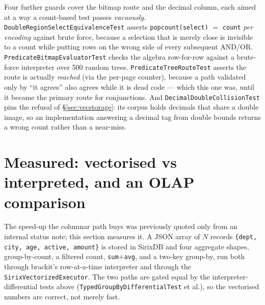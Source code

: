 \documentclass[11pt,a4paper,oneside]{report}
\theoremstyle{sirixthm}
\newcommand{\code}[1]{\texttt{#1}}
\begin{document}
Four further guards cover the bitmap route and the decimal column, each aimed at a way a
count-based test passes \emph{vacuously}. \code{DoubleRegionSelectEquivalenceTest} asserts
\code{popcount(select)} $=$ \code{count} \emph{per encoding} against brute force, because a
selection that is merely close is invisible to a count while putting rows on the wrong side of every
subsequent AND/OR. \code{PredicateBitmapEvaluatorTest} checks the algebra row-for-row against a
brute-force interpreter over 500 random trees. \code{PredicateTreeRouteTest} asserts the route is
actually \emph{reached} (via the per-page counter), because a path validated only by ``it agrees''
also agrees while it is dead code --- which this one was, until it became the primary route for
conjunctions. And \code{DecimalDoubleCollisionTest} pins the refusal of \S\ref{sec:vecstorage}: its
corpus holds decimals that share a double image, so an implementation answering a decimal tag from
double bounds returns a wrong count rather than a near-miss.

\section{Measured: vectorised vs interpreted, and an OLAP comparison}
\label{sec:vecbench}

The speed-up the columnar path buys was previously quoted only from an internal status note; this
section measures it. A JSON array of $N$ records \code{\{dept, city, age, active, amount\}} is stored in
SirixDB and four aggregate shapes, group-by-count, a filtered count, \code{sum}{+}\code{avg}, and a
two-key group-by, run both through brackit's row-at-a-time interpreter and through the
\code{SirixVectorizedExecutor}. The two paths are gated equal by the interpreter-differential tests above
(\code{TypedGroupByDifferentialTest} et al.), so the vectorised numbers are correct, not merely fast.
\end{document}
